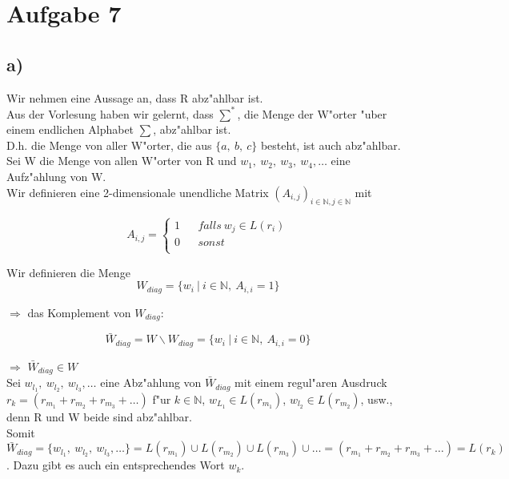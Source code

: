 \documentclass[a4paper,11pt]{scrartcl}
\begin{document}
	
\section*{Aufgabe 7}

\subsection*{a)}

	Wir nehmen eine Aussage an, dass R abz"ahlbar ist.\\ 

	Aus der Vorlesung haben wir gelernt, dass $\sum ^{*}$, die Menge der W"orter "uber einem endlichen Alphabet $\sum$, abz"ahlbar ist.\\
	
	D.h. die Menge von aller W"orter, die aus $\{ a,\ b,\ c\}$ besteht, ist auch abz"ahlbar.\\
	
	
	Sei W die Menge von allen W"orter von R und $w_1,\ w_2,\ w_3,\ w_4,\dots$ eine Aufz"ahlung von W.\\
	
	Wir definieren eine 2-dimensionale unendliche Matrix $(A_{i,j})_{i\in \mathbb{N},j\in \mathbb{N}}$ mit
	
	
	$$ A_{i,j}=\left\{
	\begin{aligned}
		1 &  & falls\ w_j \in L(r_i)\\
		0 &  & sonst\\
	\end{aligned}
	\right.
	$$
	
	Wir definieren die Menge
	$$
	W_{diag} = \{ w_i\ |\ i\in \mathbb{N},\ A_{i,i} = 1 \} 
	$$
	
	$\Longrightarrow$ das Komplement von $W_{diag}$:
	
	$$
	\bar{W}_{diag} = W\backslash W_{diag} = \{ w_i\ |\ i\in \mathbb{N},\ A_{i,i} = 0 \} 
	$$
	
	$\Longrightarrow$ $\bar{W}_{diag} \in W$\\
	
	Sei $w_{l_1},\ w_{l_2},\ w_{l_3},\dots$ eine Abz"ahlung von $\bar{W}_{diag}$ mit einem regul"aren Ausdruck $r_k = (r_{m_1} + r_{m_2} + r_{m_3} + \dots )$ f"ur $k\in \mathbb{N}$, $w_{L_1}\in L(r_{m_1})$, $w_{l_2} \in L(r_{m_2})$, usw., denn R und W beide sind abz"ahlbar.\\ 
	
	Somit $\bar{W}_{diag} =\{ w_{l_1},\ w_{l_2},\ w_{l_3},\dots \} = L(r_{m_1}) \cup L(r_{m_2}) \cup L(r_{m_3}) \cup \dots = (r_{m_1} + r_{m_2} + r_{m_3} + \dots ) = L(r_k)$. Dazu gibt es auch ein entsprechendes Wort $w_k$.\\
	
\end{document}
